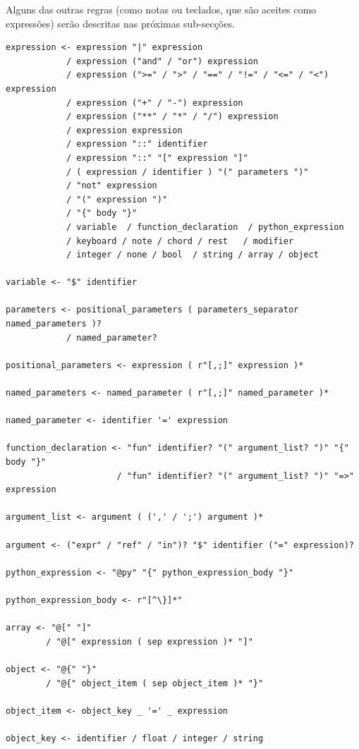 Alguns das outras regras (como notas ou teclados, que são aceites como expressões) serão descritas nas próximas sub-secções.
\begin{lstlisting}[caption={Produções de expressões na gramática},language={}]
expression <- expression "|" expression
            / expression ("and" / "or") expression
            / expression (">=" / ">" / "==" / "!=" / "<=" / "<") expression
            / expression ("+" / "-") expression
            / expression ("**" / "*" / "/") expression
            / expression expression
            / expression "::" identifier
            / expression "::" "[" expression "]"
            / ( expression / identifier ) "(" parameters ")"
            / "not" expression
            / "(" expression ")"
            / "{" body "}"
            / variable  / function_declaration  / python_expression
            / keyboard / note / chord / rest   / modifier
            / integer / none / bool  / string / array / object

variable <- "$" identifier

parameters <- positional_parameters ( parameters_separator named_parameters )?
            / named_parameter?

positional_parameters <- expression ( r"[,;]" expression )*

named_parameters <- named_parameter ( r"[,;]" named_parameter )*

named_parameter <- identifier '=' expression

function_declaration <- "fun" identifier? "(" argument_list? ")" "{" body "}"
                      / "fun" identifier? "(" argument_list? ")" "=>" expression

argument_list <- argument ( (',' / ';') argument )*

argument <- ("expr" / "ref" / "in")? "$" identifier ("=" expression)?

python_expression <- "@py" "{" python_expression_body "}"

python_expression_body <- r"[^\}]*"

array <- "@[" "]"
        / "@[" expression ( sep expression )* "]"

object <- "@{" "}"
        / "@{" object_item ( sep object_item )* "}"

object_item <- object_key _ '=' _ expression

object_key <- identifier / float / integer / string
\end{lstlisting}


